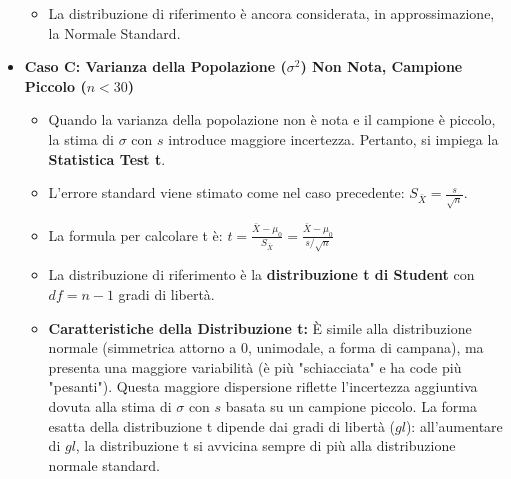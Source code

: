 \documentclass[12pt, a4paper]{article}
\newcommand{\samplemean}{\bar{X}} %
\newcommand{\popvar}{\sigma^2} %
\newcommand{\popsd}{\sigma} %
\newcommand{\samplesd}{s} %
\begin{document}
\begin{itemize}
\begin{itemize}
            \item La distribuzione di riferimento è ancora considerata, in approssimazione, la Normale Standard.
        \end{itemize}
    \item \textbf{Caso C: Varianza della Popolazione ($\popvar$) Non Nota, Campione Piccolo ($n < 30$)}
        \begin{itemize}
            \item Quando la varianza della popolazione non è nota e il campione è piccolo, la stima di $\popsd$ con $\samplesd$ introduce maggiore incertezza. Pertanto, si impiega la \textbf{Statistica Test t}.
            \item L'errore standard viene stimato come nel caso precedente: $S_{\samplemean} = \frac{\samplesd}{\sqrt{n}}$.
            \item La formula per calcolare t è: $t = \frac{\samplemean - \mu_0}{S_{\samplemean}} = \frac{\samplemean - \mu_0}{\samplesd / \sqrt{n}}$
            \item La distribuzione di riferimento è la \textbf{distribuzione t di Student} con $df = n-1$ gradi di libertà.
            \item \textbf{Caratteristiche della Distribuzione t:} È simile alla distribuzione normale (simmetrica attorno a 0, unimodale, a forma di campana), ma presenta una maggiore variabilità (è più "schiacciata" e ha code più "pesanti"). Questa maggiore dispersione riflette l'incertezza aggiuntiva dovuta alla stima di $\popsd$ con $\samplesd$ basata su un campione piccolo. La forma esatta della distribuzione t dipende dai gradi di libertà ($gl$): all'aumentare di $gl$, la distribuzione t si avvicina sempre di più alla distribuzione normale standard.
        \end{itemize}
\end{itemize}
\newpage
\end{document}
